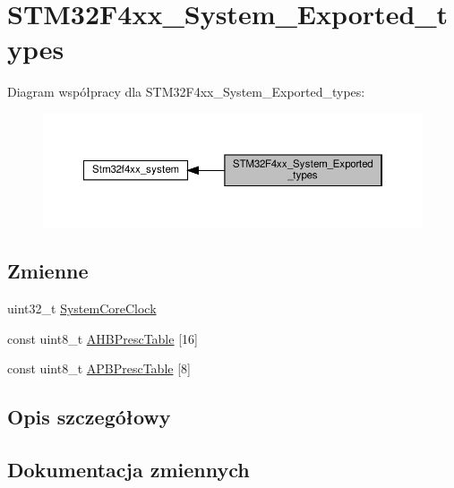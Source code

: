 \hypertarget{group___s_t_m32_f4xx___system___exported__types}{}\section{S\+T\+M32\+F4xx\+\_\+\+System\+\_\+\+Exported\+\_\+types}
\label{group___s_t_m32_f4xx___system___exported__types}
Diagram współpracy dla S\+T\+M32\+F4xx\+\_\+\+System\+\_\+\+Exported\+\_\+types\+:\nopagebreak
\begin{figure}[H]
\begin{center}
\leavevmode
\includegraphics[width=350pt]{group___s_t_m32_f4xx___system___exported__types}
\end{center}
\end{figure}
\subsection*{Zmienne}
\begin{DoxyCompactItemize}
\item 
uint32\+\_\+t \hyperlink{group___s_t_m32_f4xx___system___exported__types_gaa3cd3e43291e81e795d642b79b6088e6}{System\+Core\+Clock}
\item 
const uint8\+\_\+t \hyperlink{group___s_t_m32_f4xx___system___exported__types_ga6e1d9cd666f0eacbfde31e9932a93466}{A\+H\+B\+Presc\+Table} \mbox{[}16\mbox{]}
\item 
const uint8\+\_\+t \hyperlink{group___s_t_m32_f4xx___system___exported__types_ga5b4f8b768465842cf854a8f993b375e9}{A\+P\+B\+Presc\+Table} \mbox{[}8\mbox{]}
\end{DoxyCompactItemize}


\subsection{Opis szczegółowy}


\subsection{Dokumentacja zmiennych}
\mbox{\label{group___s_t_m32_f4xx___system___exported__types_ga6e1d9cd666f0eacbfde31e9932a93466}} 
